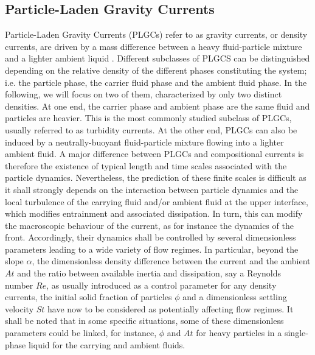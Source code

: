\documentclass[twocolumn]{article}
\begin{document}
\subsection{Particle-Laden Gravity Currents}

Particle-Laden Gravity Currents (PLGCs) refer to as gravity currents, or density currents, are driven by a mass difference between a heavy fluid-particle mixture and a lighter ambient liquid \citep{Hopfinger1983,Middleton1993,Kneller2000,Meiburg2010,wells2021}. Different subclasses of PLGCS can be distinguished depending on the relative density of the different phases constituting the system; i.e. the particle phase, the carrier fluid phase and the ambient fluid phase. In the following, we will focus on two of them, characterized by only two distinct densities. At one end, the carrier phase and ambient phase are the same fluid and particles are heavier. This is the most commonly studied subclass of PLGCs, usually referred to as turbidity currents. At the other end, PLGCs can also be induced by a neutrally-buoyant fluid-particle mixture flowing into a lighter ambient fluid. A major difference between PLGCs and compositional currents is therefore the existence of typical length and time scales associated with the particle dynamics.
Nevertheless, the prediction of these finite scales is difficult as it shall strongly depends on the interaction between particle dynamics and the local turbulence of the carrying fluid and/or ambient fluid at the upper interface, which modifies entrainment and associated dissipation. In turn, this can modify the macroscopic behaviour of the current, as for instance the dynamics of the front. Accordingly, their dynamics shall be controlled by several dimensionless parameters leading to a wide variety of flow regimes. In particular, beyond the slope $\alpha$, the dimensionless density difference between the current and the ambient $At$ and the ratio between available inertia and dissipation, say a Reynolds number $Re$, as usually introduced as a control parameter for any density currents, the initial solid fraction of particles $\phi$ and a dimensionless settling velocity $St$ have now to be considered as potentially affecting flow regimes. It shall be noted that in some specific situations, some of these dimensionless parameters could be linked, for instance, $\phi$ and $At$ for heavy particles in a single-phase liquid for the carrying and ambient fluids.
\end{document}
